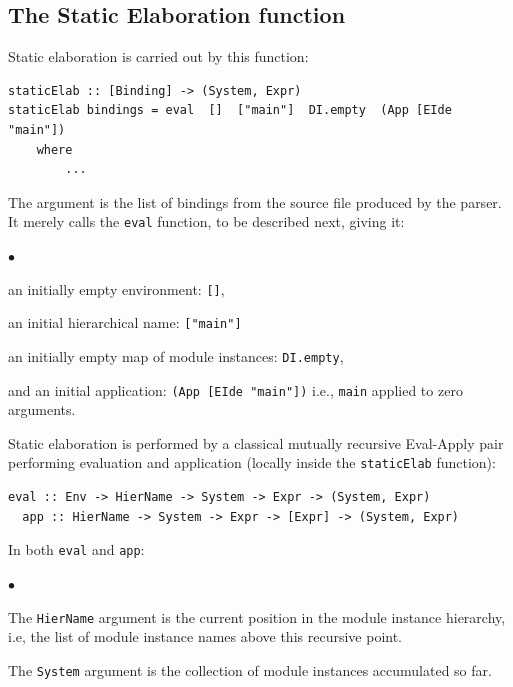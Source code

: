 \documentclass[11pt]{article}
\newenvironment{tightlist}%
{\begin{list}{$\bullet$}{%
    \setlength{\topsep}{0in}
    \setlength{\partopsep}{0in}
    \setlength{\itemsep}{0in}
    \setlength{\parsep}{0in}
    \setlength{\leftmargin}{1.5em}
    \setlength{\rightmargin}{0in}
    \setlength{\itemindent}{0in}
}
}%
{\end{list}
}
\newcommand{\term}[1]{\texttt{#1}}
\begin{document}

\subsection{The Static Elaboration function}

Static elaboration is carried out by this function:

\begin{Verbatim}[frame=single, commandchars=\\\{\}]
staticElab :: [Binding] -> (System, Expr)
staticElab bindings = eval  []  ["main"]  DI.empty  (App [EIde "main"])
    where
        ...
\end{Verbatim}

The argument is the list of bindings from the source file produced by
the parser.  It merely calls the \term{eval} function, to be described
next, giving it:
\begin{tightlist}
\item an initially empty environment: \term{[]},
\item an initial hierarchical name: \term{["main"]}
\item an initially empty map of module instances: \term{DI.empty},
\item and an initial application: \term{(App [EIde "main"])} i.e., \term{main} applied to zero arguments.
\end{tightlist}

Static elaboration is performed by a classical mutually recursive
Eval-Apply pair performing evaluation and application (locally inside
the \term{staticElab} function):

\begin{Verbatim}[frame=single, commandchars=\\\{\}]
  eval :: Env -> HierName -> System -> Expr -> (System, Expr)
  app :: HierName -> System -> Expr -> [Expr] -> (System, Expr)
\end{Verbatim}

In both \term{eval} and \term{app}:
\begin{tightlist}

\item The \term{HierName} argument is the current position in the module instance
hierarchy, i.e, the list of module instance names above this recursive point.

\item The \term{System} argument is the collection of module instances accumulated so far.

\end{tightlist}
\end{document}
